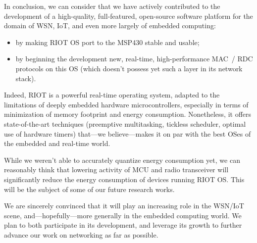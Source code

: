 \documentclass[a4paper,twoside]{article}
\begin{document}
\bigskip

In conclusion, we can consider that we have actively contributed to the
development of a high-quality, full-featured, open-source software platform
for the domain of WSN, IoT, and even more largely of embedded computing:

\begin{itemize}

\item by making RIOT OS port to the MSP430 stable and usable;

\item by beginning the development new, real-time, high-performance
      MAC~/ RDC protocols on this OS (which doesn't possess yet such
      a layer in its network stack).

\end{itemize}

Indeed, RIOT is a powerful real-time operating system, adapted to the
limitations of deeply embedded hardware microcontrollers, especially
in terms of minimization of memory footprint and energy consumption.
Nonetheless, it offers state-of-the-art techniques (preemptive
multitasking, tickless scheduler, optimal use of hardware timers)
that---we believe---makes it on par with the best OSes of the
embedded and real-time world.

While we weren't able to accurately quantize energy consumption
yet, we can reasonably think that lowering activity of MCU and radio
transceiver will significantly reduce the energy consumption of devices
running RIOT OS. This will be the subject of some of our future
research works.

We are sincerely convinced that it will play an increasing role in
the WSN/IoT scene, and---hopefully---more generally in the embedded
computing world. We plan to both participate in its development,
and leverage its growth to further advance our work on networking
as far as possible.





\vfill

{\small
}
\end{document}
